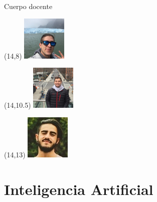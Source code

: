 \documentclass[9pt]{beamer}
\begin{document}
\begin{frame}{Cuerpo docente}
  \begin{textblock}{7}(14,8)
    \includegraphics[height=.25\textwidth]{../img/cap0_bruno.jpg}
  \end{textblock}

  \begin{textblock}{7}(14,10.5)
    \includegraphics[height=.25\textwidth]{../img/cap0_arie.jpg}
  \end{textblock}

  \begin{textblock}{7}(14,13)
    \includegraphics[height=.25\textwidth]{../img/cap0_victor.jpg}
  \end{textblock}



\end{frame}

\section{Inteligencia Artificial}
\end{document}
